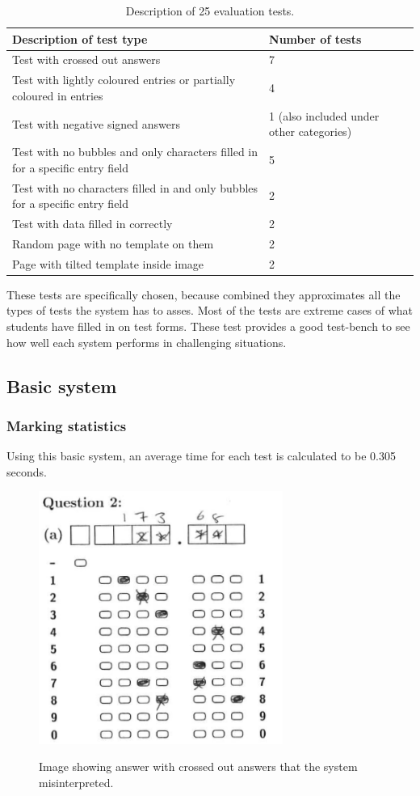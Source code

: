 \begin{table}
\caption{Description of 25 evaluation tests.} \label{tbl:25Tests}
  \centering
\begin{tabular}{|p{6cm}|p{4cm}|}
\hline
\textbf{Description of test type}&\textbf{Number of tests}\\
\hline
Test with crossed out answers&7\\
\hline
Test with lightly coloured entries or partially coloured in entries&4\\
\hline
Test with negative signed answers&1 (also included under other categories)\\
\hline
Test with no bubbles and only characters filled in for a specific entry field &5\\
\hline
Test with no characters filled in and only bubbles for a specific entry field&2\\
\hline
Test with data filled in correctly&2\\
\hline
Random page with no template on them&2\\
\hline
Page with tilted template inside image&2\\
\hline
\end{tabular} 
\end{table}

These tests are specifically chosen, because combined they approximates all the types of tests the system has to asses. Most of the tests are extreme cases of what students have filled in on test forms. These test provides a good test-bench to see how well each system performs in challenging situations.

\subsection{Basic system}
\subsubsection{Marking statistics}

Using this basic system, an average time for each test is calculated to be 0.305 seconds. 

\begin{figure}
  \centering
  \includegraphics[width=8cm]{crossClash}\\
  \caption{Image showing answer with crossed out answers that the system misinterpreted.}
  \label{fig:crossClash}
\end{figure}


